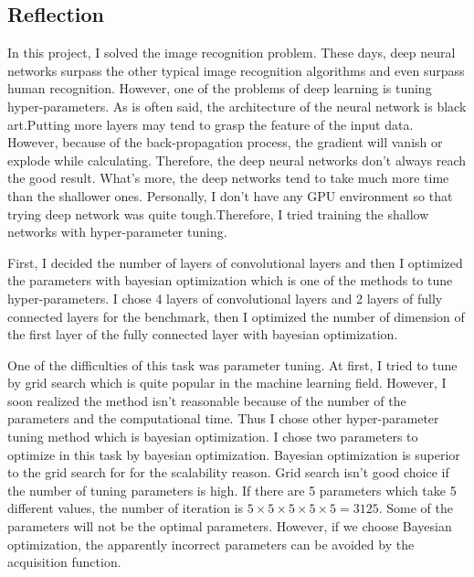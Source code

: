 \subsection{Reflection}


In this project, I solved the image recognition problem. These days, deep neural networks surpass the other typical image recognition algorithms and even surpass human recognition. However, one of the problems of deep learning is tuning hyper-parameters.
As is often said, the architecture of the neural network is black art.Putting more layers may tend to grasp the feature of the input data. However, because of the back-propagation process, the gradient will vanish or explode while calculating. Therefore, the deep neural networks don't always reach the good result. What's more, the deep networks tend to take much more time than the shallower ones. Personally, I don't have any GPU environment so that trying deep network was quite tough.Therefore, I tried training the shallow networks with hyper-parameter tuning. 

First, I decided the number of layers of convolutional layers and then I optimized the parameters with bayesian optimization which is one of the methods to tune hyper-parameters. I chose 4 layers of convolutional layers and 2 layers of fully connected layers for the benchmark, then I optimized the number of dimension of the first layer of the fully connected layer with bayesian optimization. 

One of the difficulties of this task was parameter tuning. At first, I tried to tune by grid search which is quite popular in the machine learning field. However, I soon realized the method isn't reasonable because of the number of the parameters and the computational time. Thus I chose other hyper-parameter tuning method which is bayesian optimization. I chose two parameters to optimize in this task by bayesian optimization. Bayesian optimization is superior to the grid search for for the scalability reason. Grid search isn't good choice if the number of tuning parameters is high. If there are 5 parameters which take 5 different values, the number of iteration is $5\times5\times5\times5\times5=3125$. Some of the parameters will not be the optimal parameters. However, if we choose Bayesian optimization, the apparently incorrect parameters can be avoided by the acquisition function.\\

